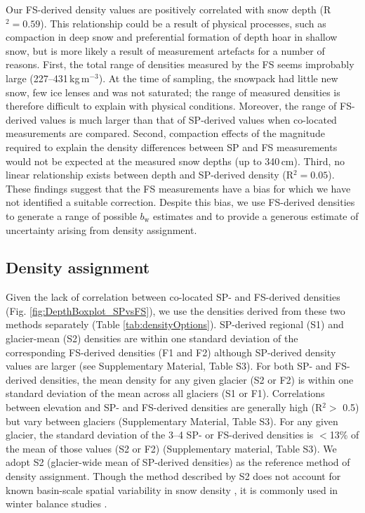 \documentclass[review,oneside, letterpaper]{igs}
\begin{document}
Our FS-derived density values are positively correlated with snow depth (R$^2= 0.59$). This relationship could be a result of physical processes, such as compaction in deep snow and preferential formation of depth hoar in shallow snow, but is more likely a result of measurement artefacts for a number of reasons. First, the total range of densities measured by the FS seems improbably large (227--431\,kg\,m$^{-3}$). At the time of sampling, the snowpack had little new snow, few ice lenses and was not saturated; the range of measured densities is therefore difficult to explain with physical conditions. Moreover, the range of FS-derived values is much larger than that of SP-derived values when co-located measurements are compared. Second, compaction effects of the magnitude required to explain the density differences between SP and FS measurements would not be expected at the measured snow depths (up to 340\,cm). Third, no linear relationship exists between depth and SP-derived density (R$^2 = 0.05$). These findings suggest that the FS measurements have a bias for which we have not identified a suitable correction. Despite this bias, we use FS-derived densities to generate a range of possible $b_\mathrm{w}$ estimates and to provide a generous estimate of uncertainty arising from density assignment.

\subsection{Density assignment}

Given the lack of correlation between co-located SP- and FS-derived densities (Fig. \ref{fig:DepthBoxplot_SPvsFS}), we use the densities derived from these two methods separately (Table \ref{tab:densityOptions}). SP-derived regional (S1) and glacier-mean (S2) densities are within one standard deviation of the corresponding FS-derived densities (F1 and F2) although SP-derived density values are larger (see Supplementary Material, Table S3). For both SP- and FS-derived densities, the mean density for any given glacier (S2 or F2) is within one standard deviation of the mean across all glaciers (S1 or F1). Correlations between elevation and SP- and FS-derived densities are generally high (R$^2>$ 0.5) but vary between glaciers (Supplementary Material, Table S3). For any given glacier, the standard deviation of the 3--4 SP- or FS-derived densities is $<$13\% of the mean of those values (S2 or F2) (Supplementary material, Table S3). We adopt S2 (glacier-wide mean of SP-derived densities) as the reference method of density assignment. Though the method described by S2 does not account for known basin-scale spatial variability in snow density \citep[e.g.][]{Wetlaufer2016}, it is commonly used in winter balance studies \citep[e.g.][]{Elder1991,McGrath2015,Cullen2017}. 
\end{document}
